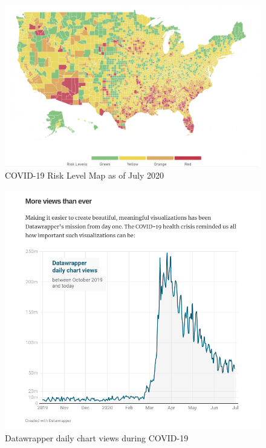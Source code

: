 \documentclass[print]{nuthesis}
\begin{document}
\begin{figure}[tbp]

{\centering \includegraphics[width=0.9\linewidth,]{images/covid19-summer2020-risk-map} 

}

\caption{COVID-19 Risk Level Map as of July 2020}\label{fig:covid19-summer2020-risk-map}
\end{figure}

\begin{figure}[tbp]

{\centering \includegraphics[width=0.9\linewidth,]{images/covid19-datawrapper-views-july2020} 

}

\caption{Datawrapper daily chart views during COVID-19}\label{fig:covid19-datawrapper-views-july2020}
\end{figure}
\end{document}
